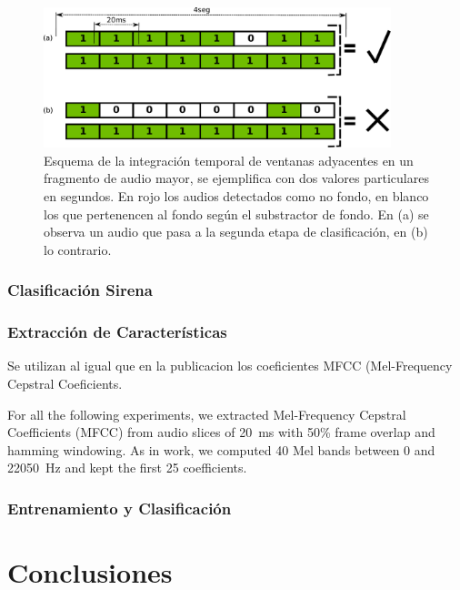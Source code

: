 \documentclass{article}
\begin{document}
\begin{figure}[h]
\begin{center}
\includegraphics[width=0.9\textwidth]{integracion_temporal} 
\caption{Esquema de la integración temporal de ventanas adyacentes en un fragmento de audio mayor, se ejemplifica con dos valores particulares en segundos. En rojo los audios detectados como no fondo, en blanco los que pertenencen al fondo según el substractor de fondo. En (a) se observa un audio que pasa a la segunda etapa de clasificación, en (b) lo contrario.}
\label{fig:integracion_temporal}
\end{center}
\end{figure}
 
\subsubsection{Clasificación Sirena}

\subsubsection*{Extracción de Características}
Se utilizan al igual que en la publicacion \cite{Salamon:UrbanSound:ACMMM:14} los coeficientes MFCC (Mel-Frequency Cepstral Coeficients. 

For all the following experiments, we extracted Mel-Frequency Cepstral Coefficients (MFCC) from audio slices of \SI{20}{\milli\second} with 50\% frame overlap and hamming windowing. As in  work, we computed 40 Mel bands between 0 and \SI{22050}{\Hz} and kept the first 25 coefficients. 

\subsubsection*{Entrenamiento y Clasificación}



\section{Conclusiones}

	






\end{document}
